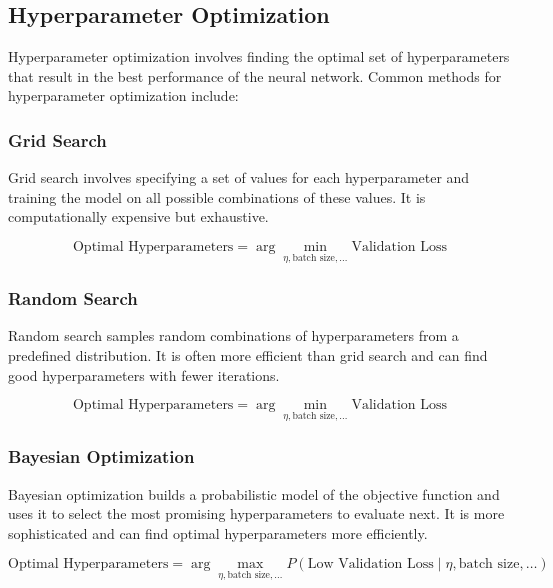     \subsection{Hyperparameter Optimization}

        Hyperparameter optimization involves finding the optimal set of hyperparameters that result in the best performance of the neural network. Common methods for hyperparameter optimization include:

        \subsubsection{Grid Search}

            Grid search involves specifying a set of values for each hyperparameter and training the model on all possible combinations of these values. It is computationally expensive but exhaustive.

            \begin{equation}
            \text{Optimal Hyperparameters} = \arg \min_{\eta, \text{batch size}, \ldots} \text{Validation Loss}
            \end{equation}

        \subsubsection{Random Search}

            Random search samples random combinations of hyperparameters from a predefined distribution. It is often more efficient than grid search and can find good hyperparameters with fewer iterations.

            \begin{equation}
            \text{Optimal Hyperparameters} = \arg \min_{\eta, \text{batch size}, \ldots} \text{Validation Loss}
            \end{equation}

        \subsubsection{Bayesian Optimization}

            Bayesian optimization builds a probabilistic model of the objective function and uses it to select the most promising hyperparameters to evaluate next. It is more sophisticated and can find optimal hyperparameters more efficiently.

            \begin{equation}
            \text{Optimal Hyperparameters} = \arg \max_{\eta, \text{batch size}, \ldots} P(\text{Low Validation Loss} \mid \eta, \text{batch size}, \ldots)
            \end{equation}

